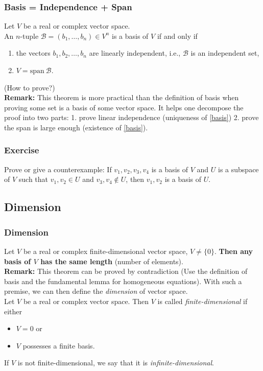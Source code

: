 \documentclass[12pt, t]{beamer}
\renewcommand{\emph}[1]{{\color{Turquoise3}\textsl{#1}}}
\newcommand{\myseries}[2]{$#1_1,#1_2,\dots,#1_#2$}
\newcommand{\nullspace}{~\\[15pt]}
\begin{document}
\begin{frame}
    \frametitle{Basis = Independence + Span}
    Let $V$ be a real or complex vector space.\\ An $n$-tuple $\mathcal{B}=(b_1,\ldots,b_n)\in V^n$ is a basis of $V$ if and only if
    \begin{enumerate}
        \item the vectors \myseries{b}{n} are linearly independent, i.e., $\mathcal{B}$ is an independent set,
        \item $V=\text{span}~\mathcal{B}.$
    \end{enumerate}
    (How to prove?)
    \nullspace
    \textbf{Remark:} This theorem is more practical than the definition of basis when proving some set is a basis of some vector space. It helps one decompose the proof into two parts: 1. prove linear independence (uniqueness of \eqref{basis}) 2. prove the span is large enough (existence of \eqref{basis}).
\end{frame}

\begin{frame}
    \frametitle{Exercise}
    Prove or give a counterexample: If $v_1,v_2,v_3,v_4$ is a basis of $V$ and $U$ is a subspace of $V$ such that $v_1,v_2\in U$ and $v_3,v_4\notin U$, then $v_1,v_2$ is a basis of $U$.
    

\end{frame}

\subsection{Dimension}
\begin{frame}
    \frametitle{Dimension}
    Let $V$ be a real or complex finite-dimensional vector space, $V\neq\{0\}$. \textbf{Then any basis of $V$ has the same length }(number of elements).
    \nullspace
    \textbf{Remark:} This theorem can be proved by contradiction (Use the definition of basis and the fundamental lemma for homogeneous equations). With such a premise, we can then define the \emph{dimension} of vector space.
    \nullspace
    Let $V$ be a real or complex vector space. Then $V$ is called \emph{finite-dimensional} if either
    \begin{itemize}
        \item $V={0}$ or
        \item $V$ possesses a finite basis.
    \end{itemize}
    If $V$ is not finite-dimensional, we say that it is \emph{infinite-dimensional}.
\end{frame}
\end{document}
